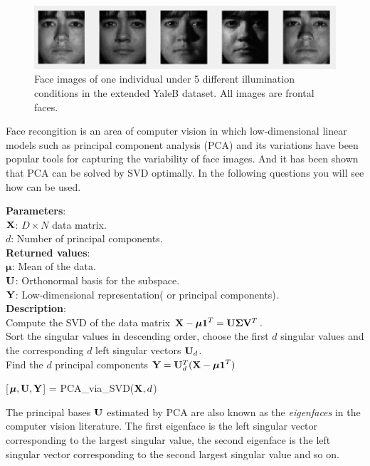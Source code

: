 \documentclass[english,onecolumn]{IEEEtran}
\newcommand{\bV}{{\bf V}}
\newcommand{\bY}{{\bf Y}}
\newcommand{\bX}{{\bf X}}
\newcommand{\bmu}{{\boldsymbol \mu}}
\newcommand{\bSig}{{\boldsymbol \Sigma}}
\newcommand{\bone}{{\boldsymbol 1}}
\newcommand{\bU}{{\bf U}}
\begin{document}
\begin{figure}[h]
    \centering
    \includegraphics{figures/example_face.png}
    \caption{Face images of one individual under 5 different illumination conditions in the extended YaleB dataset. All images are frontal faces.}
    \label{fig:my_label}
\end{figure}
\vspace{-0.3cm}
Face recongition is an area of computer vision in which low-dimensional linear models such as principal component analysis (PCA) and its variations have been popular tools for capturing the variability of face images. And it has been shown that PCA can be solved by SVD optimally. In the following questions you will see how  can be used.

\vspace{0.5cm}
\begin{algorithm}[H]
\textbf{Parameters}:\\
$\bX$: \quad $D\times N $ data matrix.\\
$d$: \quad Number of principal components.\\
\textbf{Returned values}:\\
$\bmu$: \quad Mean of the data.\\
$\bU$: \quad Orthonormal basis for the subspace.\\
$\bY$: \quad Low-dimensional representation( or principal components).\\
\textbf{Description}:\\
Compute the SVD of the data matrix $\bX - \bmu \bone^T = \bU \bSig \bV^T$.\\
Sort the singular values in descending order, choose the first $d$ singular values and the corresponding $d$ left singular vectors $\bU_d$.\\
Find the $d$ principal components $\bY = \bU_d^T(\bX - \bmu \bone^T)$
\caption{[$\bmu, \bU, \bY$] = PCA\_via\_SVD($\bX,d$) }
\label{Alg:PCA}
\end{algorithm}
\vspace{0.5cm}

The principal bases $\bU$ estimated by PCA are also known as the \textit{eigenfaces} in the computer vision literature. The first eigenface is the left singular vector corresponding to the largest singular value, the second eigenface is the left singular vector corresponding to the second largest singular value and so on.
\end{document}
